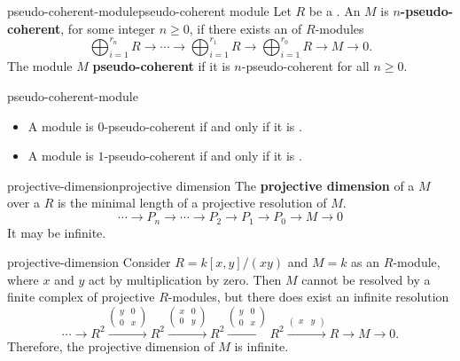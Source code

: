 \begin{topic}{pseudo-coherent-module}{pseudo-coherent module}
    Let $R$ be a . An  $M$ is \textbf{$n$-pseudo-coherent}, for some integer $n \ge 0$, if there exists an  of $R$-modules
    \[ \bigoplus_{i = 1}^{r_n} R \to \cdots \to \bigoplus_{i = 1}^{r_1} R \to \bigoplus_{i = 1}^{r_0} R \to M \to 0 . \]
    The module $M$ \textbf{pseudo-coherent} if it is $n$-pseudo-coherent for all $n \ge 0$.
\end{topic}

\begin{example}{pseudo-coherent-module}
    \begin{itemize}
        \item A module is $0$-pseudo-coherent if and only if it is .
        \item A module is $1$-pseudo-coherent if and only if it is .
    \end{itemize}
\end{example}

\begin{topic}{projective-dimension}{projective dimension}
    The \textbf{projective dimension} of a  $M$ over a  $R$ is the minimal length of a projective resolution of $M$.
    \[ \cdots \to P_n \to \cdots \to P_2 \to P_1 \to P_0 \to M \to 0 \]
    It may be infinite.
\end{topic}

\begin{example}{projective-dimension}
    Consider $R = k[x, y] / (xy)$ and $M = k$ as an $R$-module, where $x$ and $y$ act by multiplication by zero. Then $M$ cannot be resolved by a finite complex of projective $R$-modules, but there does exist an infinite resolution
    \[ \cdots \to R^2 \xrightarrow{\left(\begin{smallmatrix} y & 0 \\ 0 & x \end{smallmatrix}\right)} R^2 \xrightarrow{\left(\begin{smallmatrix} x & 0 \\ 0 & y \end{smallmatrix}\right)} R^2 \xrightarrow{\left(\begin{smallmatrix} y & 0 \\ 0 & x \end{smallmatrix}\right)} R^2 \xrightarrow{\left(\begin{smallmatrix} x & y \end{smallmatrix}\right)} R \to M \to 0 . \]
    Therefore, the projective dimension of $M$ is infinite.
\end{example}

